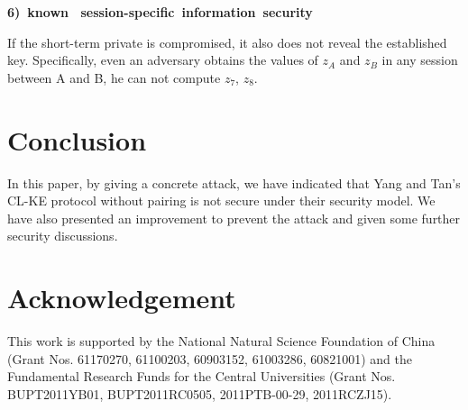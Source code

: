 \documentclass[final,1p,times,twocolumn]{elsarticle}
\begin{document}
{\bf 6)\  known \ session-specific\  information\  security}

If the short-term private is compromised, it also does not reveal the established key. Specifically, even an adversary obtains the values of $z_{A}$ and $z_{B}$ in any session between A and B, he can not compute $z_{7}$, $z_{8}$.


\section{Conclusion }
\label{6}

 In this paper, by giving a concrete attack, we have indicated that Yang and Tan's CL-KE protocol without pairing is  not secure under their security model. We have also presented an improvement to prevent the attack and given some further security discussions.



\section*{Acknowledgement}

This work is supported by the National Natural Science Foundation of China (Grant Nos. 61170270, 61100203, 60903152, 61003286, 60821001) and the
 Fundamental Research Funds for the Central Universities (Grant Nos. BUPT2011YB01, BUPT2011RC0505, 2011PTB-00-29, 2011RCZJ15).
\end{document}

